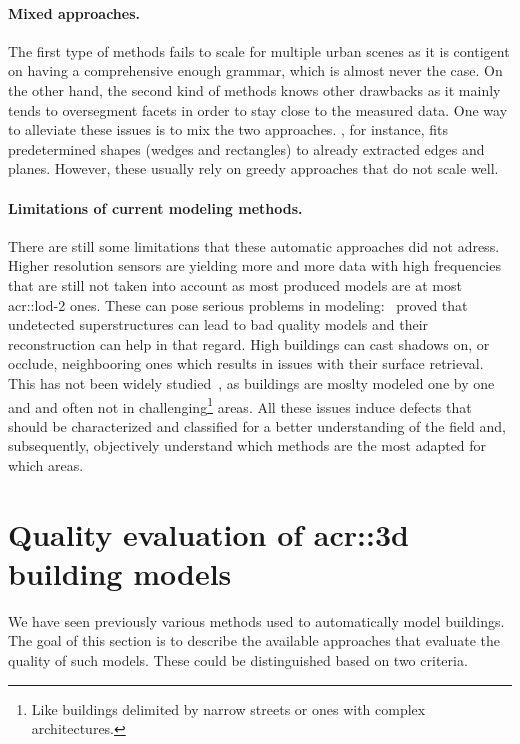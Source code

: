         \paragraph{Mixed approaches.}
            The first type of methods fails to scale for multiple urban scenes as it is contigent on having a comprehensive enough grammar, which is almost never the case.
            On the other hand, the second kind of methods knows other drawbacks as it mainly tends to oversegment facets in order to stay close to the measured data.
            One way to alleviate these issues is to mix the two approaches.
            \textcite{werner2002new}, for instance, fits predetermined shapes (wedges and rectangles) to already extracted edges and planes.
            However, these usually rely on greedy approaches that do not scale well.\\

        \paragraph{Limitations of current modeling methods.}
            There are still some limitations that these automatic approaches did not adress.
            Higher resolution sensors are yielding more and more data with high frequencies that are still not taken into account as most produced models are at most \gls{acr::lod}-2 ones.
            These can pose serious problems in modeling:~\textcite{bredif20073d} proved that undetected superstructures can lead to bad quality models and their reconstruction can help in that regard.
            High buildings can cast shadows on, or occlude, neighbooring ones which results in issues with their surface retrieval.
            This has not been widely studied~\parencite{lafarge2012creating,bao2013generating}, as buildings are moslty modeled one by one and and often not in challenging\footnote{
                Like buildings delimited by narrow streets or ones with complex architectures.
            } areas.
            All these issues induce defects that should be characterized and classified for a better understanding of the field and, subsequently, objectively understand which methods are the most adapted for which areas.

\section{Quality evaluation of \texorpdfstring{\gls*{acr::3d}}{3D} building models}
    \label{sec::state_of_the_art::quality}
    We have seen previously various methods used to automatically model buildings.
    The goal of this section is to describe the available approaches that evaluate the quality of such models.
    These could be distinguished based on two criteria.\\

